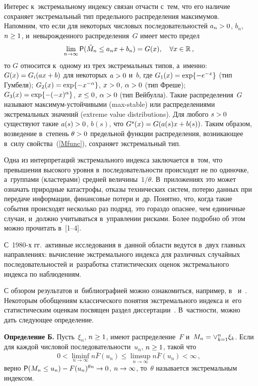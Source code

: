 \begin{multicols}{2}
Интерес к~экстремальному индексу связан от\-час\-ти с~тем,
что его наличие сохраняет экстремальный тип
предельного распределения максимумов. Напомним, что если для
некоторых числовых последовательностей
$a_n\hm>0$, $b_n$, $n\hm\ge 1$, и~невырожденного распределения~$G$
имеет место предел
$$
\lim\limits_{n\to\infty}{\sf P}({\hat M}_n\le
a_nx+b_n)=G(x),\quad \forall x\in{\mathbb{R}}\,,
$$
то $G$ относится к~одному из трех экстремальных типов, а~именно:
$G(x)\hm=G_i(ax\hm+b)$ для
некоторых $a\hm>0$ и~$b$, где $G_1(x)\hm=\exp\{-e^{-x}\}$ (тип Гумбеля);
$G_2(x)\hm=\exp\{-x^{-\alpha}\}$, $x\hm>0$,
$\alpha\hm>0$ (тип Фреше); $G_3(x)\hm=\exp\{-(-x)^\alpha\}$, $x\hm\le 0$,
$\alpha\hm>0$ (тип Вейбулла). Такие
распределения~$G$ называют мак\-си\-мум-устой\-чи\-вы\-ми (max-stable)
или распределениями экстремальных
значений (extreme value distributions). Для любого $s\hm>0$
существуют такие $a(s)\hm>0$, $b(s)$, что
$G^s(x)\hm=G(a(s)x\hm+b(s))$. Таким образом, возведение в~степень $\theta\hm>0$
предельной функции распределения,
возникающее в~силу свойства~(\ref{Mfunc}), сохраняет экстремальный тип.

Одна из интерпретаций экстремального индекса заключается в~том, что превышения высокого уровня
в~последовательности происходят не по одиночке, 
а~группами (кластерами) средней величины~$1/\theta$.
В~приложениях это может означать природные катастрофы, отказы технических систем, потерю данных при
передаче информации, финансовые потери и~др. Понятно, что, когда такие события происходят несколько
раз подряд, это гораздо опаснее, чем единичные случаи, и~должно учитываться в~управлении рисками.
Более подробно об этом можно
прочитать в~[1--4]. %


С~1980-х гг.\ активные исследования в~данной области ведутся
в~двух главных направлениях: вычисление
экстремального индекса для различных случайных последовательностей
и~разработка статистических
оценок экстремального индекса по наблюдениям.

С обзором результатов и~библиографией можно ознакомиться,
например, в~\cite[\S 8.1]{EKM} и~\cite[\S 5.5]{HF}.
Некоторым обобщениям классического понятия экстремального индекса
и~его статистическим оценкам
посвящен раздел диссертации~\cite[\S 1.2]{Novak-2013}.
В~частности, можно дать следующее определение.

\smallskip

\noindent
\textbf{Определение Б.} Пусть~$\xi_n$, $n\hm\ge 1$, имеют распределение~$F$
и~$M_n\hm=\vee_{k=1}^n\xi_k$.
Если для каждой числовой последовательности~$u_n$, $n\hm\ge 1$, такой что
$$
0<\liminf\limits_{n\to\infty}n{\bar F}(u_n)\le
\limsup\limits_{n\to\infty}n{\bar F}(u_n)<\infty\,,
$$
верно ${\sf P}(M_n\le u_n)\hm-F(u_n)^{\theta n}\hm\to 0$, $n\hm\to\infty$,
то~$\theta$ называется экстремальным индексом.


\end{multicols}
